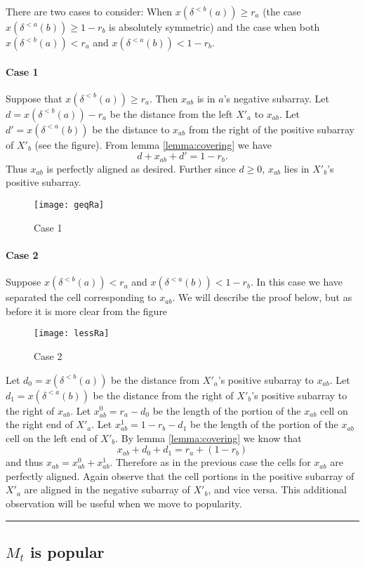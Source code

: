 \documentclass[letterpaper,12pt,oneside,onecolumn]{article}
\newenvironment{proof}{{\bf Proof:  }}{\hfill\rule{2mm}{2mm}}
\begin{document}
\begin{proof} There are two cases to consider: When $x(\delta^{<b}(a)) \geq r_a$ (the case $x(\delta^{<a}(b)) \geq 1-r_b$ is absolutely symmetric) and the case when both $x(\delta^{<b}(a)) < r_a$ and $x(\delta^{<a}(b)) < 1-r_b$.
\paragraph{Case 1}
Suppose that $x(\delta^{<b}(a)) \geq r_a$. Then $x_{ab}$ is in $a$'s negative subarray. Let $d = x(\delta^{<b}(a)) - r_a$ be the distance from the left $X'_a$ to $x_{ab}$. Let $d' = x(\delta^{<a}(b))$ be the distance to $x_{ab}$ from the right of the positive subarray of $X'_b$ (see the figure). From lemma \ref{lemma:covering} we have
$$d + x_{ab} + d' = 1-r_b.$$
Thus $x_{ab}$ is perfectly aligned as desired. Further since $d \geq 0$, $x_{ab}$ lies in $X'_b$'s positive subarray.
\begin{figure}[H]
\centering
\texttt{[image: geqRa]}
\caption{Case 1}
\end{figure}
\paragraph{Case 2}
Suppose $x(\delta^{<b}(a)) < r_a$ and $x(\delta^{<a}(b)) < 1-r_b$. In this case we have separated the cell corresponding to $x_{ab}$. We will describe the proof below, but as before it is more clear from the figure
\begin{figure}[H]
\centering
\texttt{[image: lessRa]}
\caption{Case 2}
\end{figure}
Let $d_0 = x(\delta^{<b}(a))$ be the distance from $X'_a$'s positive subarray to $x_{ab}$. Let $d_1 = x(\delta^{<a}(b))$ be the distance from the right of $X'_b$'s positive subarray to the right of $x_{ab}$. Let $x^0_{ab} = r_a-d_0$ be the length of the portion of the $x_{ab}$ cell on the right end of $X'_a$. Let $x^1_{ab} = 1-r_b - d_1$ be the length of the portion of the $x_{ab}$ cell on the left end of $X'_b$. By lemma \ref{lemma:covering} we know that
$$x_{ab} + d_0 + d_1 = r_a + (1-r_b)$$
and thus $x_{ab} = x^0_{ab} + x^1_{ab}$. Therefore as in the previous case the cells for $x_{ab}$ are perfectly aligned. Again observe that the cell portions in the positive subarray of $X'_a$ are aligned in the negative subarray of $X'_b$, and vice versa. This additional observation will be useful when we move to popularity.
\end{proof}
\subsection{$M_t$ is popular}
\end{document}
